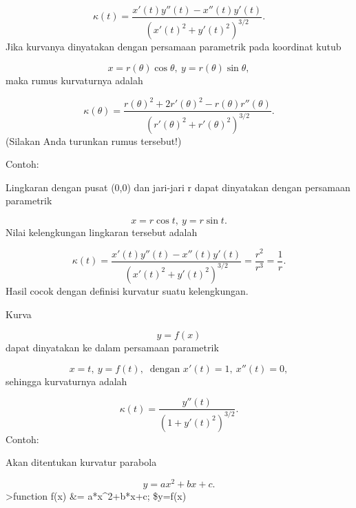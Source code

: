 \documentclass[
]{book}
\begin{document}
\[\kappa(t) = \frac{x'(t)y''(t)-x''(t)y'(t)}{\left(x'(t)^2+y'(t)^2\right)^{3/2}}.\]Jika kurvanya dinyatakan dengan persamaan parametrik pada koordinat kutub

\[x=r(\theta)\cos\theta,\ y=r(\theta)\sin\theta,\]maka rumus kurvaturnya adalah

\[\kappa(\theta) = \frac{r(\theta)^2+2r'(\theta)^2-r(\theta)r''(\theta)}{\left(r'(\theta)^2+r'(\theta)^2\right)^{3/2}}.\](Silakan Anda turunkan rumus tersebut!)

Contoh:

Lingkaran dengan pusat (0,0) dan jari-jari r dapat dinyatakan dengan persamaan parametrik

\[x=r\cos t,\ y=r\sin t.\]Nilai kelengkungan lingkaran tersebut adalah

\[\kappa(t)=\frac{x'(t)y''(t)-x''(t)y'(t)}{\left(x'(t)^2+y'(t)^2\right)^{3/2}}=\frac{r^2}{r^3}=\frac 1 r.\]Hasil cocok dengan definisi kurvatur suatu kelengkungan.

Kurva

\[y=f(x)\]dapat dinyatakan ke dalam persamaan parametrik

\[x=t,\ y=f(t),\ \text{ dengan } x'(t)=1,\ x''(t)=0,\]sehingga kurvaturnya adalah

\[\kappa(t) = \frac{y''(t)}{\left(1+y'(t)^2\right)^{3/2}}.\]Contoh:

Akan ditentukan kurvatur parabola

\[y=ax^2+bx+c.\]\textgreater function f(x) \&= a*x\^{}2+b*x+c; \$y=f(x)
\end{document}
